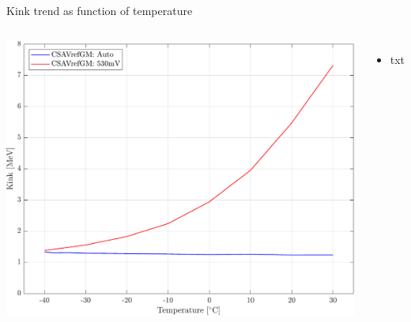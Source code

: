 \documentclass[aspectratio=169,xcolor=dvipsnames]{beamer}
\begin{document}
\begin{frame}{Kink trend as function of temperature}
\begin{columns}[T]
            \vskip-0.4cm
            \begin{center}
                \includegraphics[height=0.48\textheight]{images/temperature_effects/plot_pedestal_gain_auto_530mV.pdf}
            \end{center}
    
            \vskip-0.2cm
            \begin{itemize}
                \item txt
            \end{itemize}
    
    \end{columns}
\end{frame}
\end{document}
